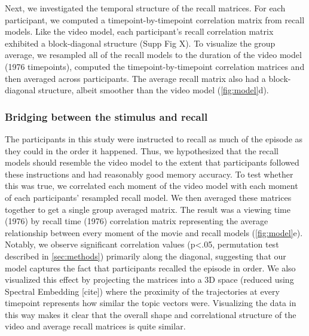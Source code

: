\documentclass{article}
\begin{document}
{Next, we investigated the temporal structure of the recall matrices. For each participant, we computed a timepoint-by-timepoint correlation matrix from recall models. Like the video model, each participant's recall correlation matrix exhibited a block-diagonal structure (Supp Fig X). To visualize the group average, we resampled all of the recall models to the duration of the video model (1976 timepoints), computed the timepoint-by-timepoint correlation matrices and then averaged across participants.  The average recall matrix also had a block-diagonal structure, albeit smoother than the video model (\ref{fig:model}d).

\subsubsection{Bridging between the stimulus and recall}
The participants in this study were instructed to recall as much of the episode as they could in the order it happened.  Thus, we hypothesized that the recall models should resemble the video model to the extent that participants followed these instructions and had reasonably good memory accuracy. To test whether this was true, we correlated each moment of the video model with each moment of each participants' resampled recall model. We then averaged these matrices together to get a single group averaged matrix.  The result was a viewing time (1976) by recall time (1976) correlation matrix representing the average relationship between every moment of the movie and recall models (\ref{fig:model}e). Notably, we observe significant correlation values (p<.05, permutation test described in \ref{sec:methods}) primarily along the diagonal, suggesting that our model captures the fact that participants recalled the episode in order. We also visualized this effect by projecting the matrices into a 3D space (reduced using Spectral Embedding [cite]) where the proximity of the trajectories at every timepoint represents how similar the topic vectors were. Visualizing the data in this way makes it clear that the overall shape and correlational structure of the video and average recall matrices is quite similar.

}
\end{document}
